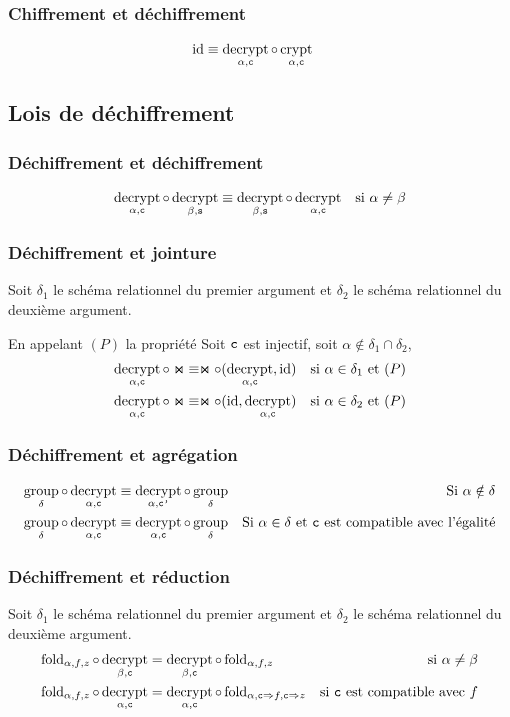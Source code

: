 \documentclass[french]{article}
\DeclareMathOperator{\crypt}{crypt}
\DeclareMathOperator{\decrypt}{decrypt}
\DeclareMathOperator{\group}{group}
\DeclareMathOperator{\id}{id}
\newcommand\typeT[1]{\text{\ttfamily #1}}
\newcommand{\decryptArgs}[2]{\decrypt_{#1 , \typeT{#2}}}
\newcommand{\cryptArgs}[2]{\crypt_{#1 , \typeT{#2}}}
\newcommand{\decryptCAlpha}{\decryptArgs{\alpha}{c}}
\newcommand{\ch}{\typeT{c}}
\newcommand{\chp}{\typeT{c'}}
\newcommand{\groupDelta}{\group_{\delta}}
\newcommand{\fold}[3]{\operatorname{fold}_{#1, #2, #3}}
\newcommand{\foldAlphafz}{\fold{\alpha}{f}{z}}
\newcommand{\args}{Soit $\delta_1$ le schéma relationnel du premier
	argument et $\delta_2$ le schéma relationnel du deuxième
	argument.}
\begin{document}
\subsubsection*{Chiffrement et déchiffrement}
\begin{align}
\id & \equiv \decryptArgs{\alpha}{c} \circ \cryptArgs{\alpha}{c}
\end{align}

\subsection*{Lois de déchiffrement}
\subsubsection*{Déchiffrement et déchiffrement}
\begin{align}
\decryptCAlpha \circ \decryptArgs{\beta}{s}
& \equiv \decryptArgs{\beta}{s} \circ \decryptCAlpha
& \text{si $\alpha \neq \beta$}
\end{align}

\subsubsection*{Déchiffrement et jointure}
\args

En appelant $(P)$ la propriété
\og Soit $\ch$ est injectif, soit $\alpha \notin \delta_1 \cap \delta_2$\fg{},
\begin{align}
\decryptCAlpha \circ \Join
& \equiv
\Join \circ (\decryptCAlpha, \id)
& \text{si $\alpha \in \delta_1$ et $(P)$} \\
\decryptCAlpha \circ \Join
& \equiv
\Join \circ (\id, \decryptCAlpha)
& \text{si $\alpha \in \delta_2$ et $(P)$} 
\end{align}

\subsubsection*{Déchiffrement et agrégation}
\begin{align}
\groupDelta \circ \decryptCAlpha
& \equiv \decryptArgs{\alpha}{\chp} \circ \groupDelta
& \text{Si $\alpha \notin \delta$} \\
\groupDelta \circ \decryptCAlpha
& \equiv \decryptCAlpha \circ \groupDelta
& \text{Si $\alpha \in \delta$ et $\ch$ est compatible avec l'égalité}
\end{align}

\subsubsection*{Déchiffrement et réduction}
\args
\begin{align}
\foldAlphafz \circ \decryptArgs{\beta}{c}
& = \decryptArgs{\beta}{c} \circ \foldAlphafz
& \text{si $\alpha \neq \beta$} \\
\foldAlphafz \circ \decryptCAlpha
& = \decryptCAlpha \circ \fold{\alpha}{\typeT{c} \Rightarrow f}{\typeT{c} \Rightarrow z}
& \text{si $\typeT{c}$ est compatible avec $f$}
\end{align}
\end{document}
